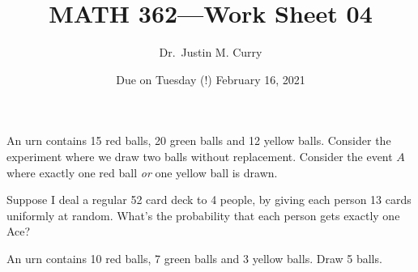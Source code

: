\documentclass[addpoints,12pt]{exam}
\title{\vspace{-1in} MATH 362---Work Sheet 04}
\date{Due on Tuesday (!) February 16, 2021}
\author{Dr.~Justin M. Curry}
\begin{document}
\maketitle


\begin{questions}
\question[4]
An urn contains 15 red balls, 20 green balls and 12 yellow balls. Consider the experiment where we draw two balls without replacement. Consider the event $A$ where exactly one red ball {\em or} one yellow ball is drawn.
\noaddpoints
{}
\addpoints

\question[2] Suppose I deal a regular 52 card deck to 4 people, by giving each person 13 cards uniformly at random. What's the probability that each person gets exactly one Ace? 

\vspace{2in}

\question[2] An urn contains 10 red balls, 7 green balls and 3 yellow balls. Draw 5 balls. 
\noaddpoints
{}
\end{questions}
\end{document}
